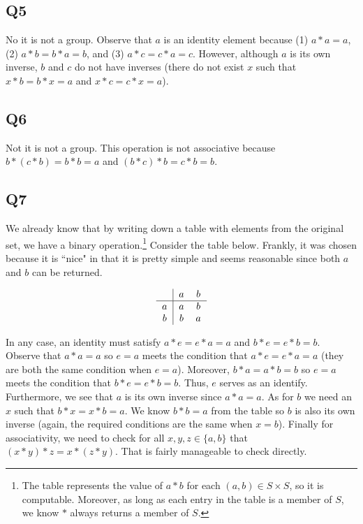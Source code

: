\documentclass[12pt]{article}
\numberwithin{theorem}{section}
\numberwithin{equation}{section}
\numberwithin{remark}{section}
\numberwithin{definition}{section}
\numberwithin{theorem}{section}
\numberwithin{lemma}{section}
\numberwithin{example}{section}
\begin{document}
\subsection{Q5}

No it is not a group. Observe that $a$ is an identity element because (1) $a*a=a$, (2) $a*b=b*a=b$, and (3) $a*c=c*a=c$. However, although $a$ is its own inverse, $b$ and $c$ do not have inverses (there do not exist $x$ such that $x*b=b*x=a$ and $x*c=c*x=a$).



\subsection{Q6}

Not it is not a group. This operation is not associative because $b*(c*b)=b*b=a$ and $(b*c)*b=c*b=b$.



\subsection{Q7}

We already know that by writing down a table with elements from the original set, we have a binary operation.\footnote{The table represents the value of $a*b$ for each $(a,b)\in S \times S$, so it is computable. Moreover, as long as each entry in the table is a member of $S$, we know $*$ always returns a member of $S$.} Consider the table below. Frankly, it was chosen because it is ``nice" in that it is pretty simple and seems reasonable since both $a$ and $b$ can be returned. 

\begin{align*}
\begin{tabular}{c|cc}
	& $a$ & $b$ \\
	\hline
	$a$ & $a$ & $b$\\
	$b$ & $b$ & $a$\\
\end{tabular}
\end{align*}

In any case, an identity must satisfy $a*e=e*a=a$ and $b*e=e*b=b$. Observe that $a*a=a$ so $e=a$ meets the condition that $a*e=e*a=a$ (they are both the same condition when $e=a$). Moreover, $b*a=a*b=b$ so $e=a$ meets the condition that $b*e=e*b=b$. Thus, $e$ serves as an identify. Furthermore, we see that $a$ is its own inverse since $a*a=a$. As for $b$ we need an $x$ such that $b*x=x*b=a$. We know $b*b=a$ from the table so $b$ is also its own inverse (again, the required conditions are the same when $x=b$). Finally for associativity, we need to check for all $x,y,z\in \{a,b\}$ that $(x*y)*z=x*(z*y)$. That is fairly manageable to check directly.
\end{document}
